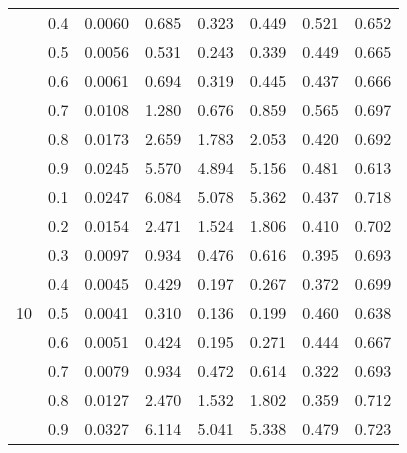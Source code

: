 \documentclass[11pt,a4paper]{report}
\begin{document}
\begin{longtable}{ | c | c || c | c | c | c | c | c | }
 & 0.4 & 0.0060 & 0.685 & 0.323 & 0.449 & 0.521 & 0.652 \\
 & 0.5 & 0.0056 & 0.531 & 0.243 & 0.339 & 0.449 & 0.665 \\
 & 0.6 & 0.0061 & 0.694 & 0.319 & 0.445 & 0.437 & 0.666 \\
 & 0.7 & 0.0108 & 1.280 & 0.676 & 0.859 & 0.565 & 0.697 \\
 & 0.8 & 0.0173 & 2.659 & 1.783 & 2.053 & 0.420 & 0.692 \\
 & 0.9 & 0.0245 & 5.570 & 4.894 & 5.156 & 0.481 & 0.613 \\
 \hline
\multirow{9}{*}{10} & 0.1 & 0.0247 & 6.084 & 5.078 & 5.362 & 0.437 & 0.718 \\
 & 0.2 & 0.0154 & 2.471 & 1.524 & 1.806 & 0.410 & 0.702 \\
 & 0.3 & 0.0097 & 0.934 & 0.476 & 0.616 & 0.395 & 0.693 \\
 & 0.4 & 0.0045 & 0.429 & 0.197 & 0.267 & 0.372 & 0.699 \\
 & 0.5 & 0.0041 & 0.310 & 0.136 & 0.199 & 0.460 & 0.638 \\
 & 0.6 & 0.0051 & 0.424 & 0.195 & 0.271 & 0.444 & 0.667 \\
 & 0.7 & 0.0079 & 0.934 & 0.472 & 0.614 & 0.322 & 0.693 \\
 & 0.8 & 0.0127 & 2.470 & 1.532 & 1.802 & 0.359 & 0.712 \\
 & 0.9 & 0.0327 & 6.114 & 5.041 & 5.338 & 0.479 & 0.723 \\
 \hline
\hline
\end{longtable}
\end{document}
